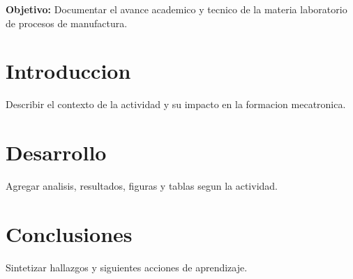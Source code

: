\documentclass[spanish,letterpaper,oneside]{article}
\begin{document}
\templatePortrait
\templatePagecfg
\onehalfspacing

\begin{abstractd}
\textbf{Objetivo:} Documentar el avance academico y tecnico de la materia laboratorio de procesos de manufactura.
\end{abstractd}

\templateIndex
\templateFinalcfg

\section{Introduccion}
Describir el contexto de la actividad y su impacto en la formacion mecatronica.

\section{Desarrollo}
Agregar analisis, resultados, figuras y tablas segun la actividad.

\section{Conclusiones}
Sintetizar hallazgos y siguientes acciones de aprendizaje.



\end{document}

